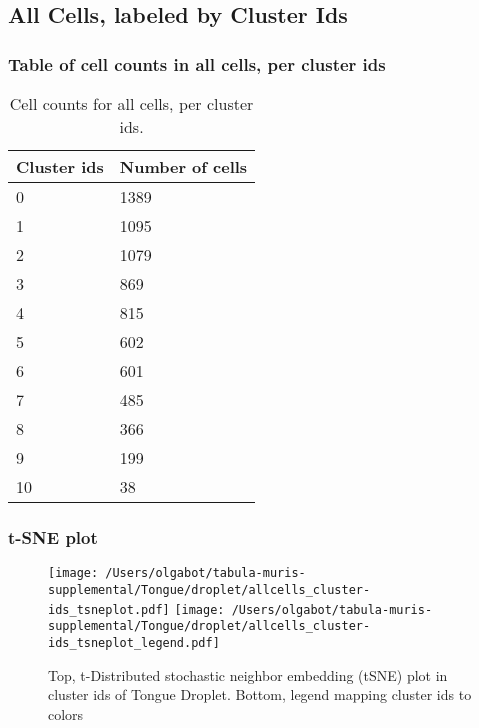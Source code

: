 \clearpage
\subsection{All Cells, labeled by Cluster Ids}
\subsubsection{Table of cell counts in all cells, per cluster ids}\begin{table}[h]
\centering
\label{my-label}
\begin{tabular}{@{}ll@{}}
\toprule

Cluster ids& Number of cells \\ \midrule
0 & 1389 \\

1 & 1095 \\

2 & 1079 \\

3 & 869 \\

4 & 815 \\

5 & 602 \\

6 & 601 \\

7 & 485 \\

8 & 366 \\

9 & 199 \\

10 & 38 \\
\bottomrule
\end{tabular}
\caption{Cell counts for all cells, per cluster ids.}
\end{table}

\clearpage
\subsubsection{t-SNE plot}
\begin{figure}[h]
\centering
\texttt{[image: /Users/olgabot/tabula-muris-supplemental/Tongue/droplet/allcells\_cluster-ids\_tsneplot.pdf]}
\texttt{[image: /Users/olgabot/tabula-muris-supplemental/Tongue/droplet/allcells\_cluster-ids\_tsneplot\_legend.pdf]}
\caption{Top, t-Distributed stochastic neighbor embedding (tSNE) plot  in cluster ids of Tongue Droplet. Bottom, legend mapping cluster ids to colors}
\end{figure}


